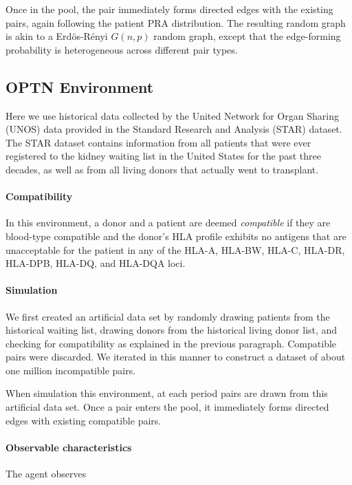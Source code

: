 \documentclass[12pt]{article}
\begin{document}
Once in the pool, the pair immediately forms directed edges with the existing pairs, again following the patient PRA distribution. The resulting random graph is akin to a Erd\"{o}s-R\'{e}nyi $G(n,p)$ random graph, except that the edge-forming probability is heterogeneous across different pair types.

\subsection{OPTN Environment}

Here we use historical data collected by the United Network for Organ Sharing (UNOS) data provided in the Standard Research and Analysis (STAR) dataset. The STAR dataset contains information from all patients that were ever registered to the kidney waiting list in the United States for the past three decades, as well as from all living donors that actually went to transplant. 


\paragraph{Compatibility} In this environment, a donor and a patient are deemed \emph{compatible} if they are blood-type compatible and the donor's HLA profile exhibits no antigens that are unacceptable for the patient in any of the HLA-A, HLA-BW, HLA-C, HLA-DR, HLA-DPB, HLA-DQ, and HLA-DQA loci.

\paragraph{Simulation} We first created an artificial data set by randomly drawing patients from the historical waiting list, drawing donors from the historical living donor list, and checking for compatibility as explained in the previous paragraph. Compatible pairs were discarded. We iterated in this manner to construct a dataset of about one million incompatible pairs.

When simulation this environment, at each period pairs are drawn from this artificial data set. Once a pair enters the pool, it immediately forms directed edges with existing compatible pairs.

\paragraph{Observable characteristics} The agent observes 
\end{document}
